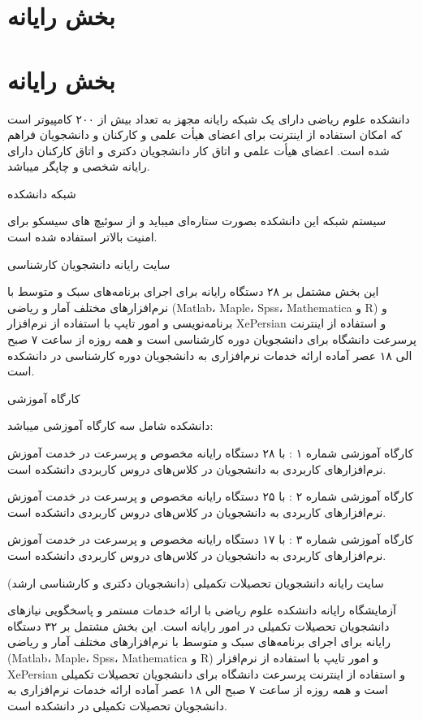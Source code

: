 \documentclass[
  letterpaper,
  DIV=11,
  numbers=noendperiod]{scrreprt}
\begin{document}
\chapter{بخش
رایانه}\label{ux628ux62eux634-ux631ux627ux6ccux627ux646ux647}


\chapter{بخش
رایانه}\label{ux628ux62eux634-ux631ux627ux6ccux627ux646ux647-1}

دانشکده علوم ریاضی دارای یک شبکه رایانه مجهز به تعداد بیش از ۲۰۰
کامپیوتر است که امکان استفاده از اینترنت برای اعضای هیأت علمی و کارکنان
و دانشجویان فراهم شده است. اعضای هیأت علمی و اتاق کار دانشجویان دکتری و
اتاق کارکنان دارای رایانه شخصی و چاپگر میباشد.

شبکه دانشکده

سیستم شبکه این دانشکده بصورت ستاره‌ای میباید و از سوئیچ های سیسکو برای
امنیت بالاتر استفاده شده است.

سایت رایانه دانشجویان کارشناسی

این بخش مشتمل بر ۲۸ دستگاه رایانه برای اجرای برنامه‌های سبک و متوسط با
نرم‌افزارهای مختلف آمار و ریاضی (Matlab، Maple، Spss، Mathematica و R) و
برنامه‌نویسی و امور تایپ با استفاده از نرم‌افزار XePersian و استفاده از
اینترنت پرسرعت دانشگاه برای دانشجویان دوره کارشناسی است و همه روزه از
ساعت ۷ صبح الی ۱۸ عصر آماده ارائه خدمات نرم‌افزاری به دانشجویان دوره
کارشناسی در دانشکده است.

کارگاه آموزشی

دانشکده شامل سه کارگاه آموزشی میباشد:

کارگاه آموزشی شماره ۱ : با ۲۸ دستگاه رایانه مخصوص و پرسرعت در خدمت آموزش
نرم‌افزارهای کاربردی به دانشجویان در کلاس‌های دروس کاربردی دانشکده است.

کارگاه آموزشی شماره ۲ : با ۲۵ دستگاه رایانه مخصوص و پرسرعت در خدمت آموزش
نرم‌افزارهای کاربردی به دانشجویان در کلاس‌های دروس کاربردی دانشکده است.

کارگاه آموزشی شماره ۳ : با ۱۷ دستگاه رایانه مخصوص و پرسرعت در خدمت آموزش
نرم‌افزارهای کاربردی به دانشجویان در کلاس‌های دروس کاربردی دانشکده است.

سایت رایانه دانشجویان تحصیلات تکمیلی (دانشجویان دکتری و کارشناسی ارشد)

آزمایشگاه رایانه دانشکده علوم ریاضی با ارائه خدمات مستمر و پاسخگویی
نیازهای دانشجویان تحصیلات تکمیلی در امور رایانه است. این بخش مشتمل بر ۳۲
دستگاه رایانه برای اجرای برنامه‌های سبک و متوسط با نرم‌افزارهای مختلف آمار
و ریاضی (Matlab، Maple، Spss، Mathematica و R) و امور تایپ با استفاده از
نرم‌افزار XePersian و استفاده از اینترنت پرسرعت دانشگاه برای دانشجویان
تحصیلات تکمیلی است و همه روزه از ساعت ۷ صبح الی ۱۸ عصر آماده ارائه خدمات
نرم‌افزاری به دانشجویان تحصیلات تکمیلی در دانشکده است.
\end{document}
